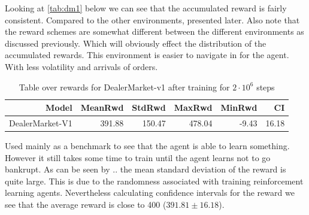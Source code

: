 \documentclass{kththesis}
\theoremstyle{definition}
\begin{document}
%		
Looking at \autoref{tab:dm1} below we can see that the accumulated reward is fairly consistent. Compared to the other environments, presented later. Also note that the reward schemes are somewhat different between the different environments as discussed previously. Which will obviously effect the distribution of the accumulated rewards. This environment is easier to navigate in for the agent. With less volatility and arrivals of orders. 
\begin{table}[H]
\centering
\begin{tabular}{rrrrrr}
  \hline
 \textbf{Model} & \textbf{MeanRwd} & \textbf{StdRwd} & \textbf{MaxRwd} & \textbf{MinRwd} & \textbf{CI} \\ 
  \hline
DealerMarket-V1 & 391.88 & 150.47 & 478.04 & -9.43 & 16.18 \\
   \hline
\end{tabular}
\caption{Table over rewards for DealerMarket-v1 after training for $2\cdot10^6$ steps}
\label{tab:dm1}
\end{table}

Used mainly as a benchmark to see that the agent is able to learn something. However it still takes some time to train until the agent learns not to go bankrupt. As can be seen by .. the mean standard deviation of the reward is quite large. This is due to the randomness associated with training reinforcement learning agents. Nevertheless calculating confidence intervals for the reward we see that the average reward is close to 400 ($391.81 \pm 16.18$).
\end{document}
